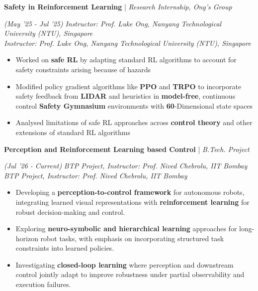 \documentclass[10pt]{article}
\newcommand{\xfill}[2][1ex]{
	\dimen0=#2\advance\dimen0 by #1
	\leaders\hrule height \dimen0 depth -#1\hfill
}
\renewcommand{\section}[1]{
	\vspace{5pt}
	{\color{Blue}{\Large\scshape\raggedright #1\xfill[0pt]{0.5pt}}}
}
\renewcommand{\subsection}[4]{
	\def\temp{#4}
	\vspace{2pt}
	{
		\large
		{\color{Green} \textbf{#1}} | {\sl #2} \filldate{#3}
		\ifx\temp\empty
		\else
		{
			\\[0.098em]
			\fontsize{10.5}{13.2}\selectfont
			\sl #4
		}
		\fi
	}
}
\newcommand{\filldate}[1]{\strut\hfill {\small \textit{(#1)}}}
\begin{document}
\subsection{Safety in Reinforcement Learning}{Research Internship, Ong's Group}{May '25 - Jul '25}{\textit{Instructor: Prof. Luke Ong, Nanyang Technological University (NTU), Singapore}}
\begin{itemize}
    \item Worked on \textbf{safe RL} by adapting standard RL algorithms to account for safety constraints arising because of hazards
    \item Modified policy gradient algorithms like \textbf{PPO} and \textbf{TRPO} to incorporate safety feedback from \textbf{LIDAR} and heuristics in \textbf{model-free}, continuous control \textbf{Safety Gymnasium} environments with \textbf{60}-Dimensional state spaces
    \item Analysed limitations of safe RL approaches across \textbf{control theory} and other extensions of standard RL algorithms
\end{itemize}
\vspace{-15px}

\section{Research Experience}

\subsection{Perception and Reinforcement Learning based Control}{B.Tech. Project}{Jul '26 - Current}{\textit{BTP Project, Instructor: Prof. Nived Chebrolu, IIT Bombay}}
\begin{itemize}
\item Developing a \textbf{perception-to-control framework} for autonomous robots, integrating learned visual representations with \textbf{reinforcement learning} for robust decision-making and control.
\item Exploring \textbf{neuro-symbolic and hierarchical learning} approaches for long-horizon robot tasks, with emphasis on incorporating structured task constraints into learned policies.
\item Investigating \textbf{closed-loop learning} where perception and downstream control jointly adapt to improve robustness under partial observability and execution failures.
\end{itemize}
\end{document}
